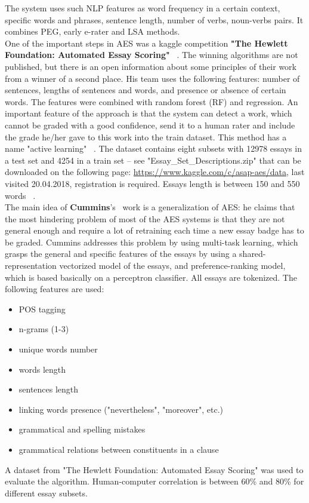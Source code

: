 The system uses such NLP features as word frequency in a certain context, specific words and phrases, sentence length, number of verbs, noun-verbs pairs. It combines PEG, early e-rater and LSA methods.\\

One of the important steps in AES was a kaggle competition \textbf{"The Hewlett Foundation: Automated Essay Scoring"} ~\cite{HewlettKaggle}. The winning algorithms are not published, but there is an open information about some principles of their work from a winner of a second place. His team uses the following features: number of sentences, lengths of sentences and words, and presence or absence of certain words. The features were combined with random forest (RF) and regression. An important feature of the approach is that the system can detect a work, which cannot be graded with a good confidence, send it to a human rater and include the grade he/her gave to this work into the train dataset. This method has a name "active learning" ~\cite{vikGit}. The dataset contains eight subsets with 12978 essays in a test set and 4254 in a train set -- see "Essay\_Set\_Descriptions.zip" that can be downloaded on the following page: \url{https://www.kaggle.com/c/asap-aes/data}, last visited 20.04.2018, registration is required. Essays length is between 150 and 550 words ~\cite{Madala}. \\

The main idea of \textbf{Cummins}'s~\cite{Cummins} work is a generalization of AES: he claims that the most hindering problem of most of the AES systems is that they are not general enough and require a lot of retraining each time a new essay badge has to be graded. Cummins addresses this problem by using multi-task learning, which grasps the general and specific features of the essays by using a shared-representation vectorized model of the essays, and preference-ranking model, which is based basically on a perceptron classifier. All essays are tokenized. The following features are used:
\begin{itemize}
\item POS tagging
\item n-grams (1-3)
\item unique words number
\item words length
\item sentences length
\item linking words presence ("nevertheless", "moreover", etc.)
\item grammatical and spelling mistakes
\item grammatical relations between constituents in a clause
\end{itemize}
A dataset from "The Hewlett Foundation: Automated Essay Scoring"  was used to evaluate the algorithm. Human-computer correlation is between 60\% and 80\% for different essay subsets.\\


